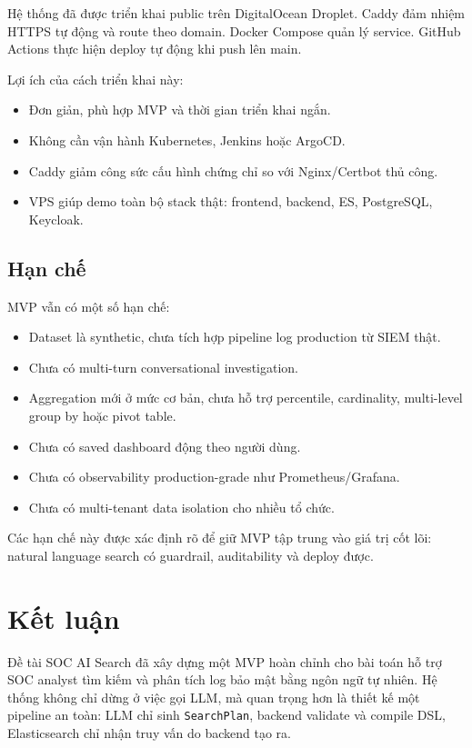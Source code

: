 \documentclass[12pt,a4paper]{report}
\newcommand{\ProjectTitle}{SOC AI Search}
\begin{document}
Hệ thống đã được triển khai public trên DigitalOcean Droplet. Caddy đảm nhiệm HTTPS tự động và route theo domain. Docker Compose quản lý service. GitHub Actions thực hiện deploy tự động khi push lên main.

Lợi ích của cách triển khai này:

\begin{itemize}
    \item Đơn giản, phù hợp MVP và thời gian triển khai ngắn.
    \item Không cần vận hành Kubernetes, Jenkins hoặc ArgoCD.
    \item Caddy giảm công sức cấu hình chứng chỉ so với Nginx/Certbot thủ công.
    \item VPS giúp demo toàn bộ stack thật: frontend, backend, ES, PostgreSQL, Keycloak.
\end{itemize}

\section{Hạn chế}

MVP vẫn có một số hạn chế:

\begin{itemize}
    \item Dataset là synthetic, chưa tích hợp pipeline log production từ SIEM thật.
    \item Chưa có multi-turn conversational investigation.
    \item Aggregation mới ở mức cơ bản, chưa hỗ trợ percentile, cardinality, multi-level group by hoặc pivot table.
    \item Chưa có saved dashboard động theo người dùng.
    \item Chưa có observability production-grade như Prometheus/Grafana.
    \item Chưa có multi-tenant data isolation cho nhiều tổ chức.
\end{itemize}

Các hạn chế này được xác định rõ để giữ MVP tập trung vào giá trị cốt lõi: natural language search có guardrail, auditability và deploy được.

\chapter{Kết luận}

Đề tài \ProjectTitle{} đã xây dựng một MVP hoàn chỉnh cho bài toán hỗ trợ SOC analyst tìm kiếm và phân tích log bảo mật bằng ngôn ngữ tự nhiên. Hệ thống không chỉ dừng ở việc gọi LLM, mà quan trọng hơn là thiết kế một pipeline an toàn: LLM chỉ sinh \texttt{SearchPlan}, backend validate và compile DSL, Elasticsearch chỉ nhận truy vấn do backend tạo ra.
\end{document}
